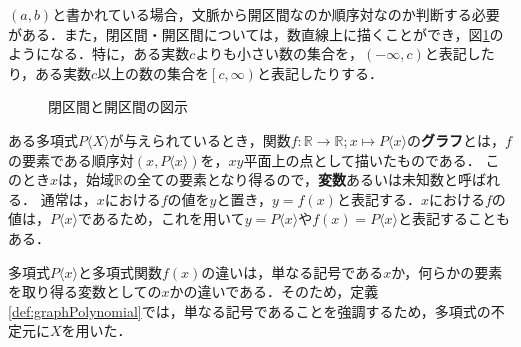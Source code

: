 \begin{rem*}
	$\left(a, b\right)$と書かれている場合，文脈から開区間なのか順序対なのか判断する必要がある．また，閉区間・開区間については，数直線上に描くことができ，図\ref{fig:interval}のようになる．特に，ある実数$c$よりも小さい数の集合を，$\left(-\infty, c\right)$と表記したり，ある実数$c$以上の数の集合を$\left[c, \infty\right)$と表記したりする．
	
	\vfill
	\begin{figure}[!h]
		\caption{閉区間と開区間の図示}
		\label{fig:interval}
	\end{figure}
\end{rem*}
\clearpage

\begin{definition}[多項式関数のグラフ]
	\label{def:graphPolynomial}%
	ある多項式$P\langle X\rangle$が与えられているとき，関数$f : \mathbb{R} \rightarrow \mathbb{R}; x \mapsto P\langle x\rangle$の\textbf{グラフ}とは，$f$の要素である順序対$(x, P\langle x\rangle)$を，$xy$平面上の点として描いたものである．
	このとき$x$は，始域$\mathbb{R}$の全ての要素となり得るので，\textbf{変数}あるいは未知数と呼ばれる．
	通常は，$x$における$f$の値を$y$と置き，$y = f(x)$と表記する．$x$における$f$の値は，$P\langle x\rangle$であるため，これを用いて$y = P\langle x\rangle$や$f(x) = P\langle x\rangle$と表記することもある．
\end{definition}
\begin{rem*}
	多項式$P\langle x\rangle$と多項式関数$f(x)$の違いは，単なる記号である$x$か，何らかの要素を取り得る変数としての$x$かの違いである．そのため，定義\ref{def:graphPolynomial}では，単なる記号であることを強調するため，多項式の不定元に$X$を用いた．
\end{rem*}

